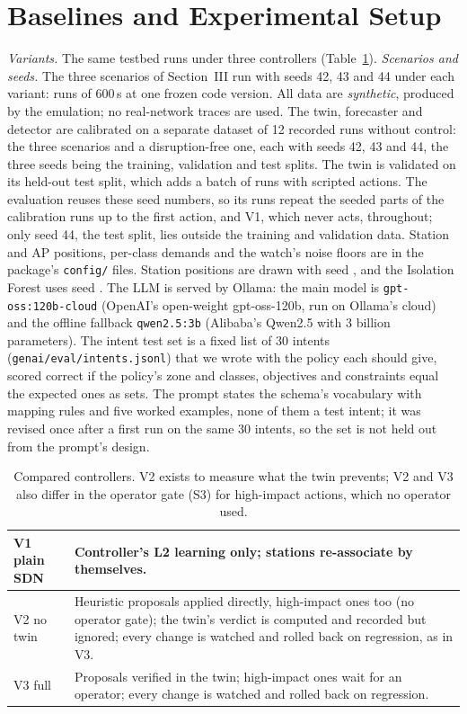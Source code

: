 \documentclass[conference]{IEEEtran}
\begin{document}
\section{Baselines and Experimental Setup}
\emph{Variants.} The same testbed runs under three controllers (Table~\ref{tab:variants}). \emph{Scenarios and seeds.} The three scenarios of Section~III run with seeds 42, 43 and 44 under each variant: \NumRuns{} runs of 600\,s at one frozen code version. All data are \emph{synthetic}, produced by the emulation; no real-network traces are used. The twin, forecaster and detector are calibrated on a separate dataset of 12 recorded runs without control: the three scenarios and a disruption-free one, each with seeds 42, 43 and 44, the three seeds being the training, validation and test splits. The twin is validated on its held-out test split, which adds a batch of runs with scripted actions. The evaluation reuses these seed numbers, so its runs repeat the seeded parts of the calibration runs up to the first action, and V1, which never acts, throughout; only seed 44, the test split, lies outside the training and validation data. Station and AP positions, per-class demands and the watch's noise floors are in the package's \texttt{config/} files. Station positions are drawn with seed \CfgStationSeed{}, and the Isolation Forest uses seed \CfgForestSeed. The LLM is served by Ollama: the main model is \texttt{gpt-oss:120b-cloud} (OpenAI's open-weight gpt-oss-120b, run on Ollama's cloud) and the offline fallback \texttt{qwen2.5:3b} (Alibaba's Qwen2.5 with 3 billion parameters). The intent test set is a fixed list of 30 intents (\texttt{genai/eval/intents.jsonl}) that we wrote with the policy each should give, scored correct if the policy's zone and classes, objectives and constraints equal the expected ones as sets. The prompt states the schema's vocabulary with mapping rules and five worked examples, none of them a test intent; it was revised once after a first run on the same 30 intents, so the set is not held out from the prompt's design.

\begin{table}[t]
\caption{Compared controllers. V2 exists to measure what the twin prevents; V2 and V3 also differ in the operator gate (S3) for high-impact actions, which no operator used.}
\label{tab:variants}
\centering\small
\begin{tabular}{|l|p{5.8cm}|}
\hline
V1 plain SDN & Controller's L2 learning only; stations re-associate by themselves.\\
\hline
V2 no twin & Heuristic proposals applied directly, high-impact ones too (no operator gate); the twin's verdict is computed and recorded but ignored; every change is watched and rolled back on regression, as in V3.\\
\hline
V3 full & Proposals verified in the twin; high-impact ones wait for an operator; every change is watched and rolled back on regression.\\
\hline
\end{tabular}
\end{table}
\end{document}
